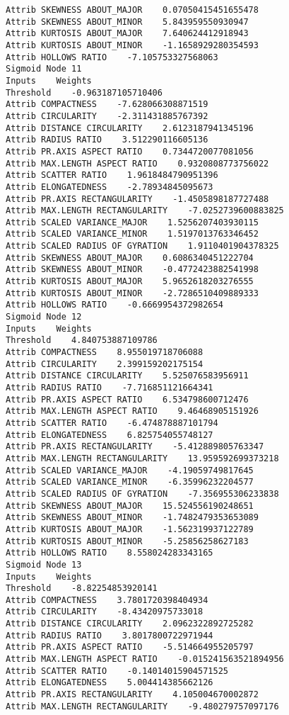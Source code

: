 \documentclass[
	article,			%
	11pt,				%
	oneside,			%
	a4paper,			%
	english,			%
	brazil,				%
	sumario=tradicional
	]{abntex2}
\begin{document}
\begin{lstlisting}
Attrib SKEWNESS ABOUT_MAJOR    0.07050415451655478
Attrib SKEWNESS ABOUT_MINOR    5.843959550930947
Attrib KURTOSIS ABOUT_MAJOR    7.640624412918943
Attrib KURTOSIS ABOUT_MINOR    -1.1658929280354593
Attrib HOLLOWS RATIO    -7.105753327568063
Sigmoid Node 11
Inputs    Weights
Threshold    -0.963187105710406
Attrib COMPACTNESS    -7.628066308871519
Attrib CIRCULARITY    -2.311431885767392
Attrib DISTANCE CIRCULARITY    2.6123187941345196
Attrib RADIUS RATIO    3.512290116605136
Attrib PR.AXIS ASPECT RATIO    0.7344720077081056
Attrib MAX.LENGTH ASPECT RATIO    0.9320808773756022
Attrib SCATTER RATIO    1.9618484790951396
Attrib ELONGATEDNESS    -2.78934845095673
Attrib PR.AXIS RECTANGULARITY    -1.4505898187727488
Attrib MAX.LENGTH RECTANGULARITY    -7.0252739600883825
Attrib SCALED VARIANCE_MAJOR    1.5256207403930115
Attrib SCALED VARIANCE_MINOR    1.5197013763346452
Attrib SCALED RADIUS OF GYRATION    1.9110401904378325
Attrib SKEWNESS ABOUT_MAJOR    0.6086340451222704
Attrib SKEWNESS ABOUT_MINOR    -0.4772423882541998
Attrib KURTOSIS ABOUT_MAJOR    5.9652618203276555
Attrib KURTOSIS ABOUT_MINOR    -2.7286510409889333
Attrib HOLLOWS RATIO    -0.6669954372982654
Sigmoid Node 12
Inputs    Weights
Threshold    4.840753887109786
Attrib COMPACTNESS    8.955019718706088
Attrib CIRCULARITY    2.399159202175154
Attrib DISTANCE CIRCULARITY    5.525076583956911
Attrib RADIUS RATIO    -7.716851121664341
Attrib PR.AXIS ASPECT RATIO    6.534798600712476
Attrib MAX.LENGTH ASPECT RATIO    9.46468905151926
Attrib SCATTER RATIO    -6.474878887101794
Attrib ELONGATEDNESS    6.825754055748127
Attrib PR.AXIS RECTANGULARITY    -5.412889805763347
Attrib MAX.LENGTH RECTANGULARITY    13.959592699373218
Attrib SCALED VARIANCE_MAJOR    -4.19059749817645
Attrib SCALED VARIANCE_MINOR    -6.35996232204577
Attrib SCALED RADIUS OF GYRATION    -7.356955306233838
Attrib SKEWNESS ABOUT_MAJOR    15.524556190248651
Attrib SKEWNESS ABOUT_MINOR    -1.7482479353653089
Attrib KURTOSIS ABOUT_MAJOR    -1.562319937122789
Attrib KURTOSIS ABOUT_MINOR    -5.25856258627183
Attrib HOLLOWS RATIO    8.558024283343165
Sigmoid Node 13
Inputs    Weights
Threshold    -8.82254853920141
Attrib COMPACTNESS    3.7801720398404934
Attrib CIRCULARITY    -8.43420975733018
Attrib DISTANCE CIRCULARITY    2.0962322892725282
Attrib RADIUS RATIO    3.8017800722971944
Attrib PR.AXIS ASPECT RATIO    -5.514664955205797
Attrib MAX.LENGTH ASPECT RATIO    -0.015241563521894956
Attrib SCATTER RATIO    -0.14014015904571525
Attrib ELONGATEDNESS    5.004414385662126
Attrib PR.AXIS RECTANGULARITY    4.105004670002872
Attrib MAX.LENGTH RECTANGULARITY    -9.480279757097176

\end{lstlisting}
\end{document}
